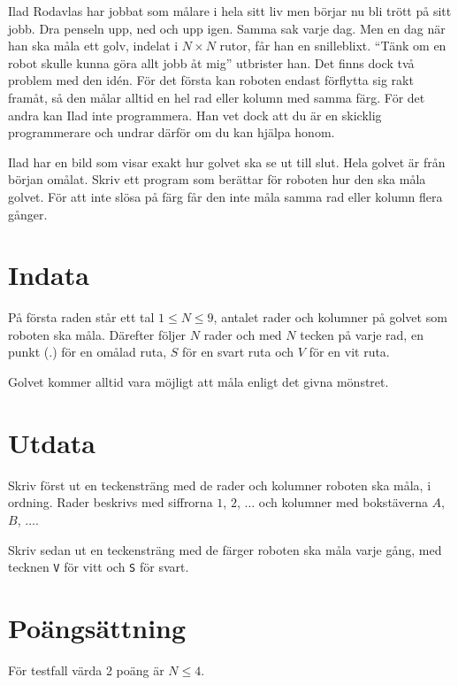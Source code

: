 Ilad Rodavlas har jobbat som målare i hela sitt liv men börjar nu bli trött på sitt jobb.
Dra penseln upp, ned och upp igen.
Samma sak varje dag.
Men en dag när han ska måla ett golv, indelat i $N \times N$ rutor, får han en snilleblixt.
``Tänk om en robot skulle kunna göra allt jobb åt mig'' utbrister han.
Det finns dock två problem med den  idén.
För det första kan roboten endast förflytta sig rakt framåt, så den målar alltid en hel rad eller kolumn med samma färg.
För det andra kan Ilad inte programmera.
Han vet dock att du är en skicklig programmerare och undrar därför om du kan hjälpa honom. 

Ilad har en bild som visar exakt hur golvet ska se ut till slut.
Hela golvet är från början omålat.
Skriv ett program som berättar för roboten hur den ska måla golvet.
För att inte slösa på färg får den inte måla samma rad eller kolumn flera gånger.


\section*{Indata}
På första raden står ett tal $1 \leq N \leq 9$, antalet rader och kolumner på golvet som roboten ska måla.
Därefter följer $N$ rader och med $N$ tecken på varje rad, en punkt ($.$) för en omålad ruta, $S$ för en svart ruta och $V$ för en vit ruta.

Golvet kommer alltid vara möjligt att måla enligt det givna mönstret. 

\section*{Utdata}
Skriv först ut en teckensträng med de rader och kolumner roboten ska måla, i ordning.
Rader beskrivs med siffrorna $1$, $2$, $\dots$ och kolumner med bokstäverna $A$, $B$, $\dots$.

Skriv sedan ut en teckensträng med de färger roboten ska måla varje gång, med tecknen \texttt{V} för vitt och \texttt{S} för svart.

\section*{Poängsättning}
För testfall värda 2 poäng är $N \le 4$.
